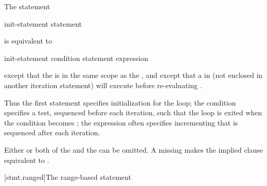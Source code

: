 \pnum
The  statement
\begin{ncsimplebnf}
 \terminal{(} init-statement  \terminal{;}  \terminal{)} statement
\end{ncsimplebnf}
is equivalent to
\begin{ncsimplebnf}
\terminal{\{}\br
\bnfindent init-statement\br
\bnfindent {} \terminal{(} condition \terminal{)} \terminal{\{}\br
\bnfindent\bnfindent statement\br
\bnfindent\bnfindent expression \terminal{;}\br
\bnfindent \terminal{\}}\br
\terminal{\}}
\end{ncsimplebnf}
except that the  is
in the same scope as the , and
except that a
%
 in  (not enclosed in another
iteration statement) will execute  before
re-evaluating .
\begin{note}
Thus the first statement specifies initialization for the loop; the
condition specifies a test, sequenced before each
iteration, such that the loop is exited when the condition becomes
; the expression often specifies incrementing that is
sequenced after each iteration.
\end{note}

\pnum
Either or both of the 
and the  can be omitted.
A missing 
makes the implied  clause
equivalent to .

[stmt.ranged]{The range-based  statement}%

